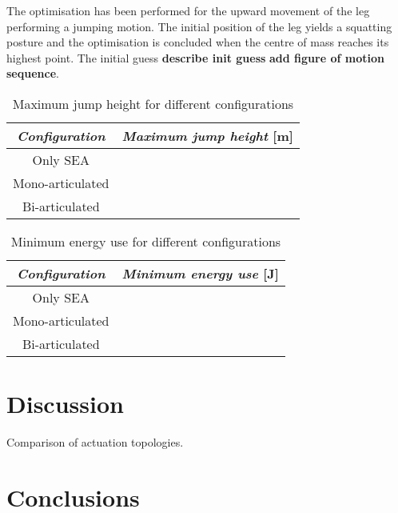 \documentclass[letterpaper, 10 pt, conference]{ieeeconf}  %
\begin{document}
The optimisation has been performed for the upward movement of the leg performing a jumping motion. The initial position of the leg yields a squatting posture and the optimisation is concluded when the centre of mass reaches its highest point. The initial guess \textbf{describe init guess}  \textbf{add figure of motion sequence}.  

\begin{table}[h]
	\caption{Maximum jump height for different configurations}
	\label{maxheight}
	\begin{center}
		\begin{tabular}{c||c}
		\textit{Configuration}	& \textit{Maximum jump height} [m] \\
			\hline
			Only SEA &   \\
			\hline
			Mono-articulated &  \\
			\hline
			Bi-articulated & 
		\end{tabular}
	\end{center}
\end{table}

\begin{table}[h]
	\caption{Minimum energy use for different configurations}
	\label{maxheight}
	\begin{center}
		\begin{tabular}{c||c}
			\textit{Configuration}	& \textit{Minimum energy use} [J] \\
			\hline
			Only SEA &   \\
			\hline
			Mono-articulated &  \\
			\hline
			Bi-articulated & 
		\end{tabular}
	\end{center}
\end{table}


\section{Discussion}

Comparison of actuation topologies.

\section{Conclusions}

\addtolength{\textheight}{-12cm}   %
\end{document}
